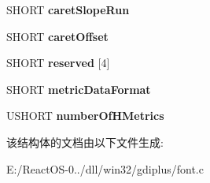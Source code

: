 \begin{DoxyCompactItemize}
\item 
\mbox{\label{struct_t_t___h_h_e_a_abba7a5198c56a365fec7810f86c6adfc}} 
S\+H\+O\+RT {\bfseries caret\+Slope\+Run}
\item 
\mbox{\label{struct_t_t___h_h_e_a_a81f8935fac8f73bede4ef1f412b60178}} 
S\+H\+O\+RT {\bfseries caret\+Offset}
\item 
\mbox{\label{struct_t_t___h_h_e_a_ab896e755ebc07f5735f7521f213a342f}} 
S\+H\+O\+RT {\bfseries reserved} \mbox{[}4\mbox{]}
\item 
\mbox{\label{struct_t_t___h_h_e_a_abfc24f8125113e3bec063025f1f8a543}} 
S\+H\+O\+RT {\bfseries metric\+Data\+Format}
\item 
\mbox{\label{struct_t_t___h_h_e_a_af495fdc40163ca69ec50e788059407e3}} 
U\+S\+H\+O\+RT {\bfseries number\+Of\+H\+Metrics}
\end{DoxyCompactItemize}


该结构体的文档由以下文件生成\+:\begin{DoxyCompactItemize}
\item 
E\+:/\+React\+O\+S-\/0../dll/win32/gdiplus/font.\+c\end{DoxyCompactItemize}
